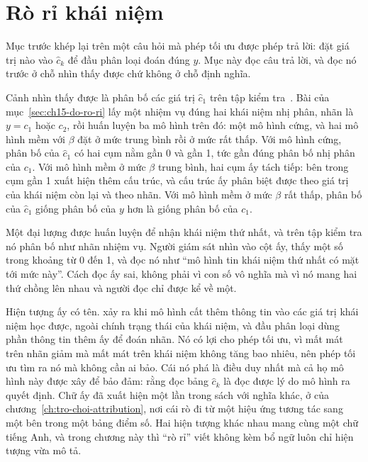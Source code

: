 \section{Rò rỉ khái niệm}
\label{sec:ch15-ro-ri}

%
Mục trước khép lại trên một câu hỏi mà phép tối ưu được phép trả lời: đặt giá
trị nào vào $\hat c_k$ để đầu phân loại đoán đúng $y$. Mục này đọc câu trả lời,
và đọc nó trước ở chỗ nhìn thấy được chứ không ở chỗ định nghĩa.

%
Cảnh nhìn thấy được là phân bố các giá trị $\hat c_1$ trên tập kiểm
tra~\autocite{p30leakage}. Bài của mục~\ref{sec:ch15-do-ro-ri} lấy một nhiệm vụ
đúng hai khái niệm
nhị phân, nhãn là $y = c_1$ hoặc $c_2$, rồi huấn luyện ba mô hình trên đó: một
mô hình cứng, và hai mô hình mềm với $\beta$ đặt ở mức trung bình rồi ở mức rất
thấp. Với mô hình cứng, phân bố của $\hat c_1$ có hai cụm nằm gần 0 và gần 1,
tức gần đúng phân bố nhị phân của $c_1$. Với mô hình mềm ở mức $\beta$ trung
bình, hai cụm ấy tách tiếp: bên trong cụm gần 1 xuất hiện thêm cấu trúc, và cấu
trúc ấy phân biệt được theo giá trị của khái niệm còn lại và theo nhãn. Với mô
hình mềm ở mức $\beta$ rất thấp, phân bố của $\hat c_1$ giống phân bố của $y$
hơn là giống phân bố của $c_1$.

Một đại lượng được huấn luyện để nhận khái niệm
thứ nhất, và trên tập kiểm tra nó phân bố như nhãn nhiệm vụ. Người giám sát nhìn
vào cột ấy, thấy một số trong khoảng từ 0 đến 1, và đọc nó như \enquote{mô hình
tin khái niệm thứ nhất có mặt tới mức này}. Cách đọc ấy sai, không phải vì con
số vô nghĩa mà vì nó mang hai thứ chồng lên nhau và người đọc chỉ được kể về
một.

%
Hiện tượng ấy có tên.  xảy ra khi mô hình cất thêm thông tin vào các giá
trị khái niệm học được, ngoài chính trạng thái của khái niệm, và đầu phân loại
dùng phần thông tin thêm ấy để đoán nhãn. Nó có lợi cho phép tối ưu, vì mất mát
trên nhãn giảm mà mất mát trên khái niệm không tăng bao nhiêu, nên phép tối ưu
tìm ra nó mà không cần ai bảo. Cái nó phá là điều duy nhất mà cả họ mô hình này
được xây để bảo đảm: rằng đọc bảng $\hat c_k$ là đọc được lý do mô hình ra quyết
định. Chữ ấy đã xuất hiện một lần trong sách với nghĩa khác, ở
 của
chương~\ref{ch:tro-choi-attribution}, nơi cái rò đi từ một hiệu ứng tương tác
sang một  bên trong một bảng điểm số.
Hai hiện tượng khác nhau
mang cùng một chữ tiếng Anh, và trong chương này thì \enquote{rò rỉ} viết không
kèm bổ ngữ luôn chỉ hiện tượng vừa mô tả.

